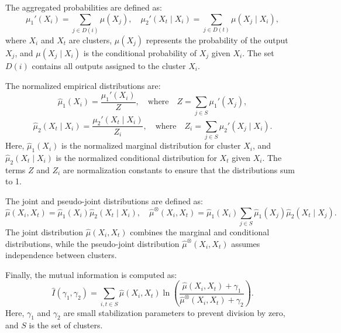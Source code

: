 The aggregated probabilities are defined as:
\[
\mu_1'(X_i) = \sum_{j \in D(i)} \mu(X_j), \quad
\mu_2'(X_t \mid X_i) = \sum_{j \in D(t)} \mu(X_j \mid X_i),
\]
where \( X_i \) and \( X_t \) are clusters, \( \mu(X_j) \) represents the probability of the output \( X_j \), and \( \mu(X_j \mid X_i) \) is the conditional probability of \( X_j \) given \( X_i \). The set \( D(i) \) contains all outputs assigned to the cluster \( X_i \).

The normalized empirical distributions are:
\[
\hat{\mu}_1(X_i) = \frac{\mu_1'(X_i)}{Z}, \quad \text{where} \quad Z = \sum_{j \in S} \mu_1'(X_j),
\]
\[
\hat{\mu}_2(X_t \mid X_i) = \frac{\mu_2'(X_t \mid X_i)}{Z_i}, \quad \text{where} \quad Z_i = \sum_{j \in S} \mu_2'(X_j \mid X_i).
\]
Here, \( \hat{\mu}_1(X_i) \) is the normalized marginal distribution for cluster \( X_i \), and \( \hat{\mu}_2(X_t \mid X_i) \) is the normalized conditional distribution for \( X_t \) given \( X_i \). The terms \( Z \) and \( Z_i \) are normalization constants to ensure that the distributions sum to 1.

The joint and pseudo-joint distributions are defined as:
\[
\hat{\mu}(X_i, X_t) = \hat{\mu}_1(X_i) \hat{\mu}_2(X_t \mid X_i), \quad
\hat{\mu}^\otimes(X_i, X_t) = \hat{\mu}_1(X_i) \sum_{j \in S} \hat{\mu}_1(X_j) \hat{\mu}_2(X_t \mid X_j).
\]
The joint distribution \( \hat{\mu}(X_i, X_t) \) combines the marginal and conditional distributions, while the pseudo-joint distribution \( \hat{\mu}^\otimes(X_i, X_t) \) assumes independence between clusters.

Finally, the mutual information is computed as:
\[
\hat{I}(\gamma_1, \gamma_2) = \sum_{i, t \in S} \hat{\mu}(X_i, X_t) \ln \left( \frac{\hat{\mu}(X_i, X_t) + \gamma_1}{\hat{\mu}^\otimes(X_i, X_t) + \gamma_2} \right).
\]
Here, \( \gamma_1 \) and \( \gamma_2 \) are small stabilization parameters to prevent division by zero, and \( S \) is the set of clusters.

